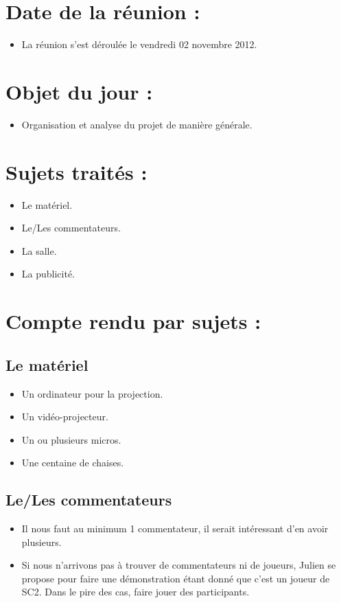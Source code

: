 \section{Date de la réunion :}
\begin{itemize}
\item La réunion s'est déroulée le vendredi 02 novembre 2012.
\end{itemize}

\section{Objet du jour :}
\begin{itemize}
\item Organisation et analyse du projet de manière générale.
\end{itemize}

\section{Sujets traités :}
\begin{itemize}
\item Le matériel.
\item Le/Les commentateurs.
\item La salle.
\item La publicité.
\end{itemize}

\section{Compte rendu par sujets :}

\subsection{Le matériel}
\begin{itemize}
\item Un ordinateur pour la projection.
\item Un vidéo-projecteur.
\item Un ou plusieurs  micros.
\item Une centaine de chaises.
\end{itemize}

\subsection{Le/Les commentateurs}
\begin{itemize}
\item Il nous faut au minimum 1 commentateur, il serait intéressant d'en avoir plusieurs.
\item Si nous n'arrivons pas à trouver de commentateurs ni de joueurs, Julien se propose pour faire une démonstration étant donné que c'est un joueur de SC2. Dans le pire des cas, faire jouer des participants.
\end{itemize}

